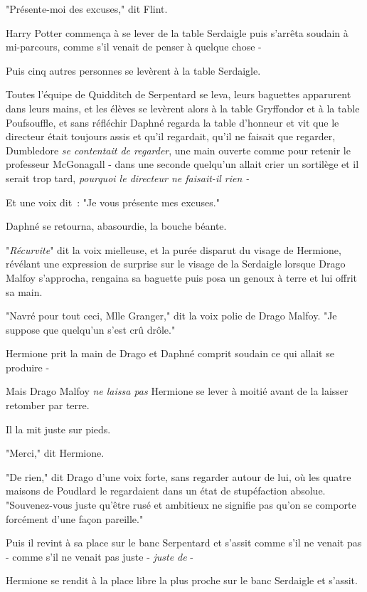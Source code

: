 "Présente-moi des excuses," dit Flint.

Harry Potter commença à se lever de la table Serdaigle puis s'arrêta soudain à mi-parcours, comme s'il venait de penser à quelque chose -

Puis cinq autres personnes se levèrent à la table Serdaigle.

Toutes l'équipe de Quidditch de Serpentard se leva, leurs baguettes apparurent dans leurs mains, et les élèves se levèrent alors à la table Gryffondor et à la table Poufsouffle, et sans réfléchir Daphné regarda la table d'honneur et vit que le directeur était toujours assis et qu'il regardait, qu'il ne faisait que regarder, Dumbledore \emph{se contentait de regarder}, une main ouverte comme pour retenir le professeur McGonagall - dans une seconde quelqu'un allait crier un sortilège et il serait trop tard, \emph{pourquoi le directeur ne faisait-il rien -}

Et une voix dit~: "Je vous présente mes excuses."

Daphné se retourna, abasourdie, la bouche béante.

"\emph{Récurvite}" dit la voix mielleuse, et la purée disparut du visage de Hermione, révélant une expression de surprise sur le visage de la Serdaigle lorsque Drago Malfoy s'approcha, rengaina sa baguette puis posa un genoux à terre et lui offrit sa main.

"Navré pour tout ceci, Mlle Granger," dit la voix polie de Drago Malfoy. "Je suppose que quelqu'un s'est crû drôle."

Hermione prit la main de Drago et Daphné comprit soudain ce qui allait se produire -

Mais Drago Malfoy \emph{ne laissa pas} Hermione se lever à moitié avant de la laisser retomber par terre.

Il la mit juste sur pieds.

"Merci," dit Hermione.

"De rien," dit Drago d'une voix forte, sans regarder autour de lui, où les quatre maisons de Poudlard le regardaient dans un état de stupéfaction absolue. "Souvenez-vous juste qu'être rusé et ambitieux ne signifie pas qu'on se comporte forcément d'une façon pareille."

Puis il revint à sa place sur le banc Serpentard et s'assit comme s'il ne venait pas - comme s'il ne venait pas juste - \emph{juste de} -

Hermione se rendit à la place libre la plus proche sur le banc Serdaigle et s'assit.

